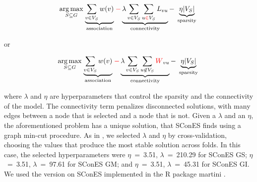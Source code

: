 \documentclass[twocolumn, 11pt]{article}
\begin{document}
\begin{description}
\begin{equation}
\label{eq:scones}
\underset{S \subseteq G}{\arg \max } \underbrace{\sum_{v \in V_S} w(v)}_{\text { association }} {\color{red}-} \underbrace{\lambda \sum_{v \in V_S} \sum_{u {\color{red} \in} V_S} L_{vu} }_{\text { connectivity }}-\underbrace{\eta \lvert V_S \rvert }_{\text { sparsity }}
\end{equation}

or 

\begin{equation}
\label{eq:scones}
\underset{S \subseteq G}{\arg \max } \underbrace{\sum_{v \in V_S} w(v)}_{\text { association }} {\color{red}-} \underbrace{\lambda \sum_{v \in V_S} \sum_{u \not\in V_S} {\color{red}W}_{vu} }_{\text { connectivity }}-\underbrace{\eta \lvert V_S \rvert }_{\text { sparsity }}
\end{equation}

where \(\lambda\) and \(\eta\) are hyperparameters that control the sparsity and the connectivity of the model. The connectivity term penalizes disconnected solutions, with many edges between a node that is selected and a node that is not. Given a $\lambda$ and an $\eta$, the aforementioned problem has a unique solution, that SConES finds using a graph min-cut procedure. As in \citet{azencott_efficient_2013}, we selected \(\lambda\) and \(\eta\) by cross-validation, choosing the values that produce the most stable solution across folds. In this case, the selected hyperparameters were \(\eta\)~=~3.51, \(\lambda\)~=~210.29 for SConES GS; \(\eta\)~=~3.51, \(\lambda\)~=~97.61 for SConES GM; and \(\eta\)~=~3.51, \(\lambda\)~=~45.31 for SConES GI. We used the version on SConES implemented in the R package martini \cite{martini}.
\end{description}
\end{document}

